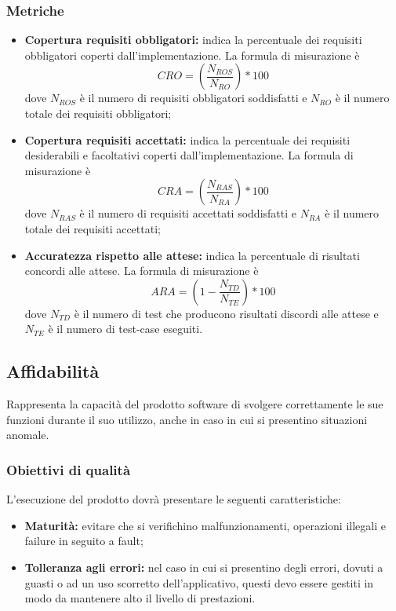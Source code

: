 \documentclass[PianoDiQualifica.tex]{subfiles}
\begin{document}
\subsubsection{Metriche}
\begin{itemize}
	\item \textbf{Copertura requisiti obbligatori:} indica la percentuale dei requisiti obbligatori coperti dall'implementazione. La formula di misurazione è \[CRO=(\frac{N_{ROS}}{N_{RO}})*100\] dove $ N_{ROS} $ è il numero di requisiti obbligatori soddisfatti e $ N_{RO} $ è il numero totale dei requisiti obbligatori;
	\item \textbf{Copertura requisiti accettati:} indica la percentuale dei requisiti desiderabili e facoltativi coperti dall'implementazione. La formula di misurazione è \[CRA=(\frac{N_{RAS}}{N_{RA}})*100\] dove $ N_{RAS} $ è il numero di requisiti accettati soddisfatti e $ N_{RA } $ è il numero totale dei requisiti accettati;
	\item \textbf{Accuratezza rispetto alle attese:} indica la percentuale di risultati concordi alle attese. La formula di misurazione è \[ARA=(1-\frac{N_{TD}}{N_{TE}})*100\] dove $ N_{TD} $ è il numero di test che producono risultati discordi alle attese e $ N_{TE} $ è il numero di test-case eseguiti.
\end{itemize}
		
\subsection{Affidabilità}
Rappresenta la capacità del prodotto software di svolgere correttamente le sue funzioni durante il suo utilizzo, anche in caso in cui si presentino situazioni anomale.
\subsubsection{Obiettivi di qualità}
L'esecuzione del prodotto dovrà presentare le seguenti caratteristiche:
\begin{itemize}
	\item \textbf{Maturità:} evitare che si verifichino malfunzionamenti, operazioni illegali e failure in seguito a fault;
	\item \textbf{Tolleranza agli errori:} nel caso in cui si presentino degli errori, dovuti a guasti o ad un uso scorretto dell'applicativo, questi devo essere gestiti in modo da mantenere alto il livello di prestazioni.
\end{itemize}
\end{document}
